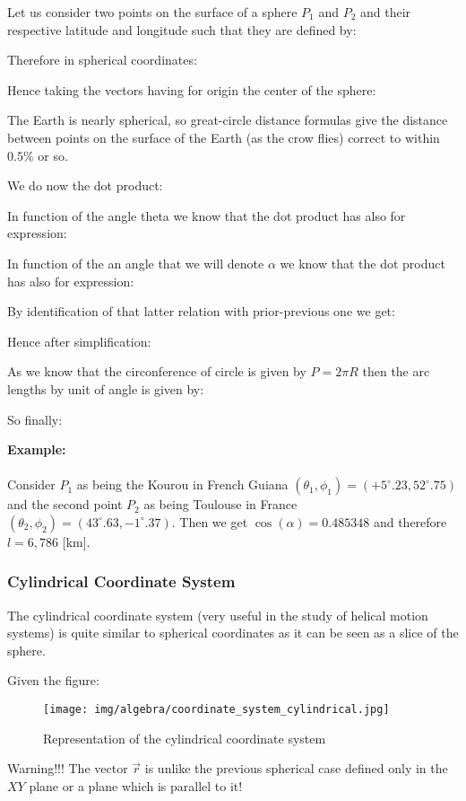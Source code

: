 	Let us consider two points on the surface of a sphere $P_1$ and $P_2$ and their respective latitude and longitude such that they are defined by:
	
	Therefore in spherical coordinates:
	
	Hence taking the vectors having for origin the center of the sphere:
	
	The Earth is nearly spherical, so great-circle distance formulas give the distance between points on the surface of the Earth (as the crow flies) correct to within $0.5\%$ or so.
	
	We do now the dot product:
	
	In function of the angle theta we know that the dot product has also for expression:
	
	In function of the an angle that we will denote $\alpha$ we know that the dot product has also for expression:
	
	By identification of that latter relation with prior-previous one we get:
	
	Hence after simplification:
	
	As we know that the circonference of circle is given by $P=2\pi R$ then the arc lengths by unit of angle is given by:
	
	So finally:
	
	\begin{tcolorbox}[colframe=black,colback=white,sharp corners]
	\textbf{{\Large {}}Example:}\\\\
	Consider $P_1$ as being the Kourou in French Guiana $(\theta_1,\phi_1)=(+5^\circ.23,52^\circ.75)$ and the second point $P_2$ as being Toulouse in France $(\theta_2,\phi_2)=(43^\circ.63,-1^\circ.37)$. Then we get $\cos(\alpha)=0.485348$ and therefore $l=6,786$ [km].
	\end{tcolorbox}

	\pagebreak
	\subsubsection{Cylindrical Coordinate System}\label{cylindrical coordinates}
	The cylindrical coordinate system (very useful in the study of helical motion systems) is quite similar to spherical coordinates as it can be seen as a slice of the sphere. 

	Given the figure:
	\begin{figure}[H]
		\centering
		\texttt{[image: img/algebra/coordinate\_system\_cylindrical.jpg]}
		\caption{Representation of the cylindrical coordinate system}
	\end{figure}
	Warning!!! The vector $\vec{r}$ is unlike the previous spherical case defined only in the $XY$ plane or a plane which is parallel to it!
	
